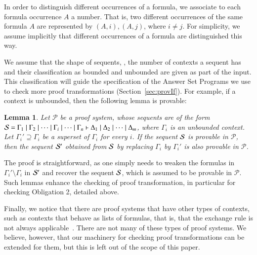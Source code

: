 \documentclass{new_tlp}
\newtheorem{lemma}[theorem]{Lemma}
\begin{document}
In order to distinguish different occurrences of a formula, we 
associate to each formula occurrence $A$ a number. 
That is, two different occurrences of the same formula $A$ are represented by $(A, i), (A, j)$, 
where $i \neq j$.
For simplicity, we assume implicitly that different occurrences of 
a formula are distinguished this way.

We assume that the shape of sequents, 
\ie, the number of contexts a sequent has and their classification as bounded and unbounded 
 are given as part of the input.
This classification will guide the specification of the Answer Set Programs we use to 
check more proof transformations (Section~\ref{sec:provIf}). 
For example, if a context is unbounded, then the following lemma is provable:
\begin{lemma}
\label{lem:unbounded}
Let $\mathcal{P}$ be a proof system, whose sequents are of the form $\Sscr =
\Gamma_1 \mid \Gamma_2 \mid \cdots \mid \Gamma_i \mid \cdots \mid \Gamma_n
\vdash \Delta_1 \mid \Delta_2 \mid \cdots \mid \Delta_m$, where $\Gamma_i$ is an
unbounded context. Let $\Gamma_i' \supseteq \Gamma_i$ be a superset of $\Gamma_i$ for every $i$.
If the sequent $\Sscr$ is provable in $\mathcal{P}$, then the sequent $\Sscr'$
obtained from $\Sscr$ by replacing $\Gamma_i$ by $\Gamma_i'$ is also provable in
$\mathcal{P}$. 
\end{lemma}
The proof is straightforward, as one simply needs to weaken the formulas in $\Gamma_i'\setminus \Gamma_i$
in $\Sscr'$ and recover the sequent $\Sscr$, which is assumed to be provable in
$\mathcal{P}$.
Such lemmas enhance the checking of proof transformation, in particular for checking Obligation 2, 
detailed above.

Finally, we notice that there are proof systems that have other types of contexts, such as  
contexts that behave as lists of formulas, that is, that the exchange rule is not always
applicable~\cite{pfenning09lics}. There are not many of these types of proof systems. We believe, however, 
that our machinery for checking proof transformations can be extended for them, but 
this is left out of the scope of this paper.

\vspace{-2mm}
\end{document}
